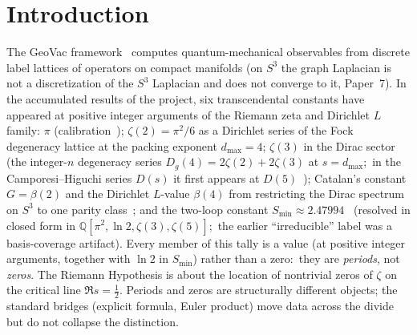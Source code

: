 \documentclass[11pt]{article}
\begin{document}
\begin{abstract}
its chirality companion $\chi\to-\chi$ is not a graph symmetry at all
--- the two spinor-bundle chiralities differing in size by the discrete
Dirac index $n_{\max}(n_{\max}+1)$, which explains the failure of
relativistic $\mathbb{Z}_2$ tapering.
(4)~\emph{Scope boundary}: Fock's Wick rotation $S^3\to H^3$ is
mathematically clean~\cite{bander1966} but produces no natural discrete
quotient $H^3/\Gamma$ from framework invariants; the Selberg-zeta
direction on hyperbolic quotients of hydrogen is therefore structurally
closed.  The Ihara-to-classical-$\zeta$ bridge is additionally blocked
by bipartiteness (odd-argument Dirichlet characters such as $\chi_{-4}$
have support disjoint from the Ihara walk-length spectrum), and the
direct bridge from the spectral-side Dirichlet series of Paper 28 to
classical RH is closed as well.
\end{abstract}

\section{Introduction}

The GeoVac framework~\cite{paper1,paper7} computes quantum-mechanical
observables from discrete label lattices of operators on compact
manifolds (on $S^3$ the graph Laplacian is not a discretization of the
$S^3$ Laplacian and does not converge to it, Paper~7).  In
the accumulated results of the project, six transcendental constants
have appeared at positive integer arguments of the Riemann zeta and
Dirichlet $L$ family:
$\pi$ (calibration~\cite{paper18});
$\zeta(2)=\pi^2/6$ as a Dirichlet series of the Fock degeneracy lattice
at the packing exponent $d_{\max}=4$;
$\zeta(3)$ in the Dirac sector (the integer-$n$ degeneracy series
$D_g(4) = 2\zeta(2) + 2\zeta(3)$ at $s=d_{\max}$;\ in the
Camporesi--Higuchi series $D(s)$ it first appears at $D(5)$~\cite{paper28});
Catalan's constant $G=\beta(2)$ and the Dirichlet $L$-value $\beta(4)$
from restricting the Dirac spectrum on $S^3$ to one parity
class~\cite{paper28}; and
the two-loop constant $S_{\min}\approx 2.47994$~\cite{paper28} (resolved in
closed form in $\mathbb{Q}[\pi^2, \ln 2, \zeta(3), \zeta(5)]$;\ the earlier
``irreducible'' label was a basis-coverage artifact).
Every member of this tally is a value (at positive integer arguments,
together with $\ln 2$ in $S_{\min}$) rather than a zero:\ they are
\emph{periods}, not \emph{zeros}.  The Riemann
Hypothesis is about the location of nontrivial zeros of $\zeta$ on
the critical line $\Re s = \tfrac12$.  Periods and zeros are
structurally different objects; the standard bridges (explicit
formula, Euler product) move data across the divide but do not
collapse the distinction.
\end{document}
